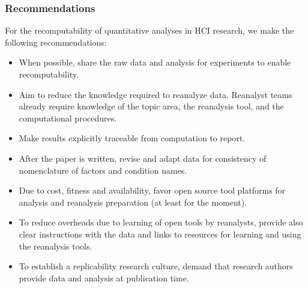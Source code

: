 \subsubsection{Recommendations}
For the recomputability of quantitative analyses in HCI research, we make the following recommendations:
\begin{itemize}
\item When possible, share the raw data and analysis for experiments to enable recomputability.
\item Aim to reduce the knowledge required to reanalyze data. Reanalyst teams already require knowledge of the topic area, the reanalysis tool, and the computational procedures.
\item Make results explicitly traceable from computation to report.
\item After the paper is written, revise and adapt data for consistency of nomenclature of factors and condition names.
\item Due to cost, fitness and availability, favor open source tool platforms for analysis and reanalysis preparation (at least for the moment).
\item To reduce overheads due to learning of open tools by reanalysts, provide also clear instructions with the data and links to resources for learning and using the reanalysis tools.
\item To establish a replicability research culture, demand that research authors provide data and analysis at publication time.
\end{itemize}
